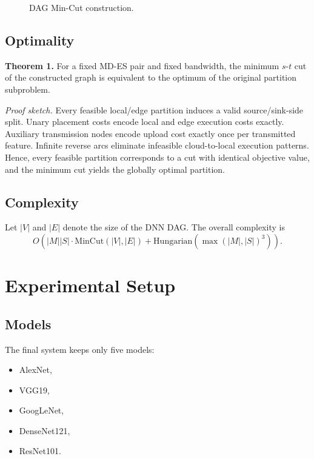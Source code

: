 \documentclass[conference]{IEEEtran}
\begin{document}
\begin{figure}[t]
\centering
{}
\caption{DAG Min-Cut construction.}
\label{fig:mincut}
\end{figure}

\subsection{Optimality}

\textbf{Theorem 1.} For a fixed MD-ES pair and fixed bandwidth, the minimum
$s$-$t$ cut of the constructed graph is equivalent to the optimum of the
original partition subproblem.

\textit{Proof sketch.} Every feasible local/edge partition induces a valid
source/sink-side split. Unary placement costs encode local and edge execution
costs exactly. Auxiliary transmission nodes encode upload cost exactly once per
transmitted feature. Infinite reverse arcs eliminate infeasible cloud-to-local
execution patterns. Hence, every feasible partition corresponds to a cut with
identical objective value, and the minimum cut yields the globally optimal
partition.

\subsection{Complexity}

Let $|V|$ and $|E|$ denote the size of the DNN DAG. The overall complexity is
\begin{equation}
O\!\left(|M||S|\cdot \text{MinCut}(|V|,|E|) + \text{Hungarian}(\max(|M|,|S|)^3)\right).
\end{equation}

\section{Experimental Setup}

\subsection{Models}

The final system keeps only five models:
\begin{itemize}
\item AlexNet,
\item VGG19,
\item GoogLeNet,
\item DenseNet121,
\item ResNet101.
\end{itemize}
\end{document}
